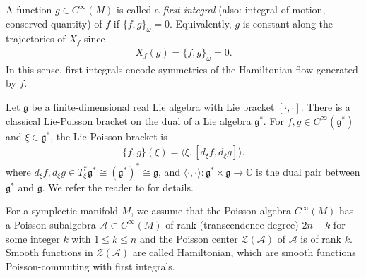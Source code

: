 \documentclass[11pt,reqno]{amsart}
\newtheorem*{theorem A}{Main Theorem A}
\newtheorem*{theorem B}{Main Theorem B}
\newtheorem*{theorem C}{Main Theorem C}
\newtheorem*{theorem D}{Main Theorem D}
\theoremstyle{definition}
\theoremstyle{plain}
\theoremstyle{conclusion}
\begin{document}
A function $g\in C^\infty(M)$ is called a \textit{first integral} (also: integral of motion, conserved quantity) of $f$ if $\{f,g\}_\omega=0$. Equivalently, $g$ is constant along the trajectories of $X_f$ since
\begin{align*}
X_f(g)=\{f,g\}_\omega=0.
\end{align*}
In this sense, first integrals encode symmetries of the Hamiltonian flow generated by $f$.

Let $\mathfrak{g}$ be a finite-dimensional real Lie algebra with Lie bracket $[\cdot,\cdot]$. There is a classical Lie-Poisson bracket on the dual of a Lie algebra $\mathfrak{g}^*$. For $f,g\in C^\infty(\mathfrak{g}^*)$ and $\xi\in \mathfrak{g}^*$, the Lie-Poisson bracket is
\begin{align}
\{f,g\}(\xi)=\langle \xi, [d_\xi f, d_\xi g] \rangle .\label{eq:poiss}
\end{align}
where $d_\xi f, d_\xi g \in  T_\xi^*\mathfrak{g}^*\cong \left(\mathfrak{g}^*\right)^* \cong \mathfrak{g}$, and $\langle \cdot,\cdot \rangle : \mathfrak{g}^*\times \mathfrak{g} \rightarrow \mathbb{C}$ is the dual pair between $\mathfrak{g}^*$ and $\mathfrak{g}$. We refer the reader to  \cite[Chapter 7]{MR2906391} for details. 

For a symplectic manifold $M$, we assume that the Poisson algebra $C^\infty(M)$  has a Poisson subalgebra $\mathcal{A} \subset C^\infty(M)$ of rank (transcendence degree) $2n-k$ for some integer $k$ with $1\leqslant k\leqslant n$ and the Poisson center $\mathcal{Z}(\mathcal{A})$ of $ \mathcal{A}$ is of rank $k$.  Smooth functions in $\mathcal{Z}(\mathcal{A})$ are called Hamiltonian, which are smooth functions Poisson-commuting with first integrals. %

\end{document}
